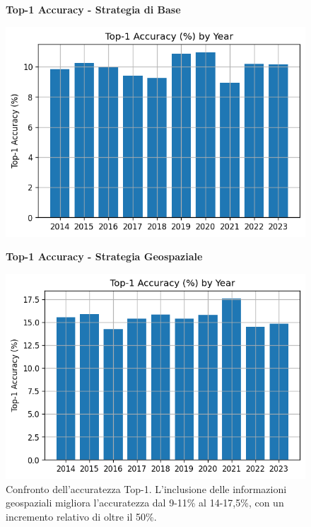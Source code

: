 \begin{figure}[htbp]
\centering
\begin{minipage}{0.48\textwidth}
\centering
\textbf{Top-1 Accuracy - Strategia di Base}\par
\vspace{0.3em}
\includegraphics[width=\textwidth]{../../img/llama3.1_8b/no_SPACE-GEO_n-1_come_current_POI/top1_accuracy.png}
\end{minipage}
\hfill
\begin{minipage}{0.48\textwidth}
\centering
\textbf{Top-1 Accuracy - Strategia Geospaziale}\par
\vspace{0.3em}
\includegraphics[width=\textwidth]{../../img/llama3.1_8b/SPACE-GEO_n-1_come_current_POI/top_1_accuracy.png}
\end{minipage}
\caption{Confronto dell'accuratezza Top-1. L'inclusione delle informazioni geospaziali migliora l'accuratezza dal 9-11\% al 14-17,5\%, con un incremento relativo di oltre il 50\%.}
\label{fig:top1_comparison}
\end{figure}

